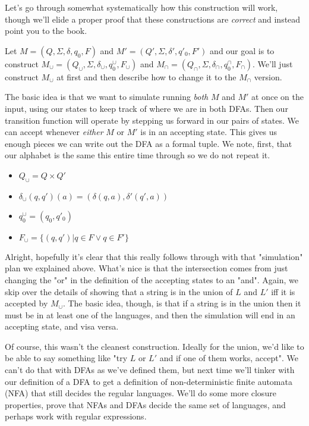 \documentclass[11pt]{article}
\begin{document}
Let's go through somewhat systematically how this construction will work, though we'll elide a proper proof that these constructions are \emph{correct} and instead point you to the book.

Let $M = (Q,\Sigma,\delta,q_0,F)$ and $M' = (Q',\Sigma,\delta',q'_0,F')$ and our goal is to construct $M_{\cup} = (Q_{\cup},\Sigma,\delta_{\cup},q^{\cup}_0,F_{\cup})$ and $M_{\cap} = (Q_{\cap},\Sigma,\delta_{\cap},q^{\cap}_0,F_{\cap})$. We'll just construct $M_{\cup}$ at first and then describe how to change it to the $M_{\cap}$ version.

The basic idea is that we want to simulate running \emph{both} $M$ and $M'$ at once on the input, using our states to keep track of where we are in both DFAs. Then our transition function will operate by stepping us forward in our pairs of states. We can accept whenever \emph{either} $M$ or $M'$ is in an accepting state. This gives us enough pieces we can write out the DFA as a formal tuple. We note, first, that our alphabet is the same this entire time through so we do not repeat it.

\begin{itemize}
\item $Q_{\cup} = Q \times Q'$
\item $\delta_{\cup}(q,q')(a) = (\delta(q,a),\delta'(q',a))$
\item $q^{\cup}_0 = (q_0,q'_0)$
\item $F_{\cup} = \{(q,q') | q \in F \vee q \in F'\}$
\end{itemize}

Alright, hopefully it's clear that this really follows through with that "simulation" plan we explained above. What's nice is that the intersection comes from just changing the "or" in the definition of the accepting states to an "and". Again, we skip over the details of showing that a string is in the union of $L$ and $L'$ iff it is accepted by $M_{\cup}$. The basic idea, though, is that if a string is in the union then it must be in at least one of the languages, and then the simulation will end in an accepting state, and visa versa.

Of course, this wasn't the cleanest construction. Ideally for the union, we'd like to be able to say something like "try $L$ or $L'$ and if one of them works, accept". We can't do that with DFAs as we've defined them, but next time we'll tinker with our definition of a DFA to get a definition of non-deterministic finite automata (NFA) that still decides the regular languages. We'll do some more closure properties, prove that NFAs and DFAs decide the same set of languages, and perhaps work with regular expressions.
\end{document}
